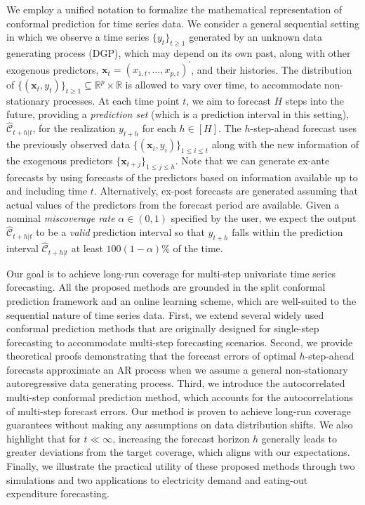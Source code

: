 \documentclass[
  11pt,
  a4paper,
]{article}
\theoremstyle{plain}
\theoremstyle{remark}
\begin{document}
We employ a unified notation to formalize the mathematical
representation of conformal prediction for time series data. We consider
a general sequential setting in which we observe a time series
\(\{y_t\}_{t \geq 1}\) generated by an unknown data generating process
(DGP), which may depend on its own past, along with other exogenous
predictors, \(\bm{x}_t=(x_{1,t},\ldots,x_{p,t})^{\prime}\), and their
histories. The distribution of
\(\{(\bm{x}_t, y_t)\}_{t \geq 1} \subseteq \mathbb{R}^p \times \mathbb{R}\)
is allowed to vary over time, to accommodate non-stationary processes.
At each time point \(t\), we aim to forecast \(H\) steps into the
future, providing a \emph{prediction set} (which is a prediction
interval in this setting), \(\hat{\mathcal{C}}_{t+h|t}\), for the
realization \(y_{t+h}\) for each \(h\in[H]\). The \(h\)-step-ahead
forecast uses the previously observed data
\(\{(\bm{x}_i, y_i)\}_{1 \leq i \leq t}\) along with the new information
of the exogenous predictors \(\{\bm{x}_{t+j}\}_{1\leq j\leq h}\). Note
that we can generate ex-ante forecasts by using forecasts of the
predictors based on information available up to and including time
\(t\). Alternatively, ex-post forecasts are generated assuming that
actual values of the predictors from the forecast period are available.
Given a nominal \emph{miscoverage rate} \(\alpha \in (0,1)\) specified
by the user, we expect the output \(\hat{\mathcal{C}}_{t+h|t}\) to be a
\emph{valid} prediction interval so that \(y_{t+h}\) falls within the
prediction interval \(\hat{\mathcal{C}}_{t+h|t}\) at least
\(100(1-\alpha)\%\) of the time.

Our goal is to achieve long-run coverage for multi-step univariate time
series forecasting. All the proposed methods are grounded in the split
conformal prediction framework and an online learning scheme, which are
well-suited to the sequential nature of time series data. First, we
extend several widely used conformal prediction methods that are
originally designed for single-step forecasting to accommodate
multi-step forecasting scenarios. Second, we provide theoretical proofs
demonstrating that the forecast errors of optimal \(h\)-step-ahead
forecasts approximate an AR process when we assume a general
non-stationary autoregressive data generating process. Third, we
introduce the autocorrelated multi-step conformal prediction method,
which accounts for the autocorrelations of multi-step forecast errors.
Our method is proven to achieve long-run coverage guarantees without
making any assumptions on data distribution shifts. We also highlight
that for \(t \ll \infty\), increasing the forecast horizon \(h\)
generally leads to greater deviations from the target coverage, which
aligns with our expectations. Finally, we illustrate the practical
utility of these proposed methods through two simulations and two
applications to electricity demand and eating-out expenditure
forecasting.
\end{document}
